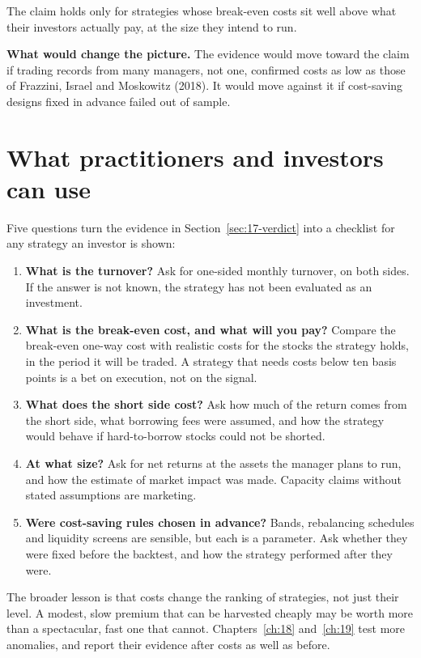 The claim holds only for strategies whose break-even costs sit well above what their investors actually pay, at the size they intend to run.

\textbf{What would change the picture.} The evidence would move toward the claim if trading records from many managers, not one, confirmed costs as low as those of Frazzini, Israel and Moskowitz (2018). It would move against it if cost-saving designs fixed in advance failed out of sample.

\section{What practitioners and investors can use}
\label{sec:17-investors}

Five questions turn the evidence in Section~\ref{sec:17-verdict} into a checklist for any strategy an investor is shown:

\begin{enumerate}
  \item \textbf{What is the turnover?} Ask for one-sided monthly turnover, on both sides. If the answer is not known, the strategy has not been evaluated as an investment.
  \item \textbf{What is the break-even cost, and what will you pay?} Compare the break-even one-way cost with realistic costs for the stocks the strategy holds, in the period it will be traded. A strategy that needs costs below ten basis points is a bet on execution, not on the signal.
  \item \textbf{What does the short side cost?} Ask how much of the return comes from the short side, what borrowing fees were assumed, and how the strategy would behave if hard-to-borrow stocks could not be shorted.
  \item \textbf{At what size?} Ask for net returns at the assets the manager plans to run, and how the estimate of market impact was made. Capacity claims without stated assumptions are marketing.
  \item \textbf{Were cost-saving rules chosen in advance?} Bands, rebalancing schedules and liquidity screens are sensible, but each is a parameter. Ask whether they were fixed before the backtest, and how the strategy performed after they were.
\end{enumerate}

The broader lesson is that costs change the ranking of strategies, not just their level. A modest, slow premium that can be harvested cheaply may be worth more than a spectacular, fast one that cannot. Chapters~\ref{ch:18} and~\ref{ch:19} test more anomalies, and report their evidence after costs as well as before.

